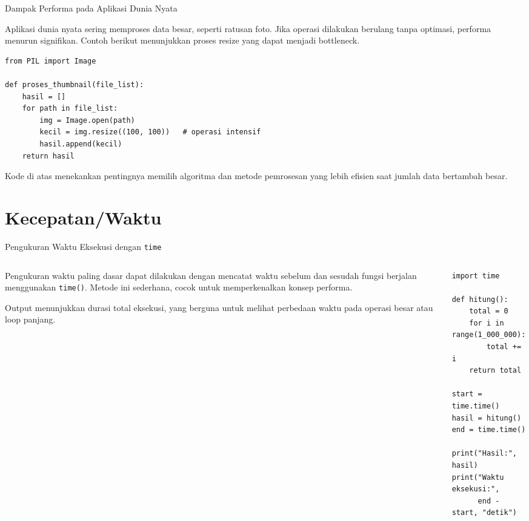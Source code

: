 \documentclass[aspectratio=169, table]{beamer}
\begin{document}
\begin{frame}[fragile]{Dampak Performa pada Aplikasi Dunia Nyata}
\vspace{6pt}

Aplikasi dunia nyata sering memproses data besar, seperti ratusan foto.
Jika operasi dilakukan berulang tanpa optimasi, performa menurun signifikan.
Contoh berikut menunjukkan proses resize yang dapat menjadi bottleneck.

\begin{lstlisting}[style=PythonStyle, basicstyle=\ttfamily\scriptsize]
from PIL import Image

def proses_thumbnail(file_list):
    hasil = []
    for path in file_list:
        img = Image.open(path)
        kecil = img.resize((100, 100))   # operasi intensif
        hasil.append(kecil)
    return hasil
\end{lstlisting}

Kode di atas menekankan pentingnya memilih algoritma dan metode pemrosesan
yang lebih efisien saat jumlah data bertambah besar.
\end{frame}


\section{Kecepatan/Waktu}

\begin{frame}[fragile]{Pengukuran Waktu Eksekusi dengan \texttt{time}}
\vspace{10pt}

\begin{columns}[T]

\begin{column}{0.45\linewidth}
\small
Pengukuran waktu paling dasar dapat dilakukan dengan mencatat waktu
sebelum dan sesudah fungsi berjalan menggunakan \texttt{time()}.
Metode ini sederhana, cocok untuk memperkenalkan konsep performa.

\medskip
Output menunjukkan durasi total eksekusi, yang berguna untuk melihat
perbedaan waktu pada operasi besar atau loop panjang.
\end{column}

\begin{column}{0.52\linewidth}

\begin{lstlisting}[style=PythonStyle, basicstyle=\ttfamily\scriptsize]
import time

def hitung():
    total = 0
    for i in range(1_000_000):
        total += i
    return total

start = time.time()
hasil = hitung()
end = time.time()

print("Hasil:", hasil)
print("Waktu eksekusi:",
      end - start, "detik")
\end{lstlisting}

\end{column}

\end{columns}
\end{frame}
\end{document}

